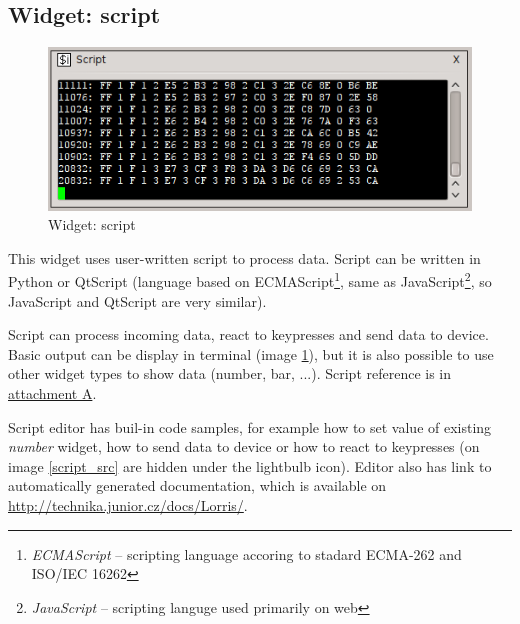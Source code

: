 \documentclass[12pt, a4paper, oneside]{article}
\newcommand{\It}{\textit}  %
\begin{document}
\subsection{Widget: script}
\begin{figure}[h]
\begin{center}
\includegraphics[scale=0.8]{img/w_script.png}
\caption{Widget: script}
\label{script_w}
\end{center}
\end{figure}
This widget uses user-written script to process data. Script can be written in Python or QtScript\cite{qtscript} (language based on ECMAScript\footnote{\It{ECMAScript} -- scripting language accoring to stadard ECMA-262 and ISO/IEC 16262}, same as JavaScript\footnote{\It{JavaScript} -- scripting languge used primarily on web}, so JavaScript and QtScript are very similar).

Script can process incoming data, react to keypresses and send data to device. Basic output can be display in terminal (image \ref{script_w}), but it is also possible to use other widget types to show data (number, bar, ...). Script reference is in \hyperref[script_ref]{attachment A}.

Script editor has buil-in code samples, for example how to set value of existing \It{number} widget, how to send data to device or how to react to keypresses (on image \ref{script_src} are hidden under the lightbulb icon). Editor also has link to automatically generated documentation, which is available on \url{http://technika.junior.cz/docs/Lorris/}.
\end{document}
